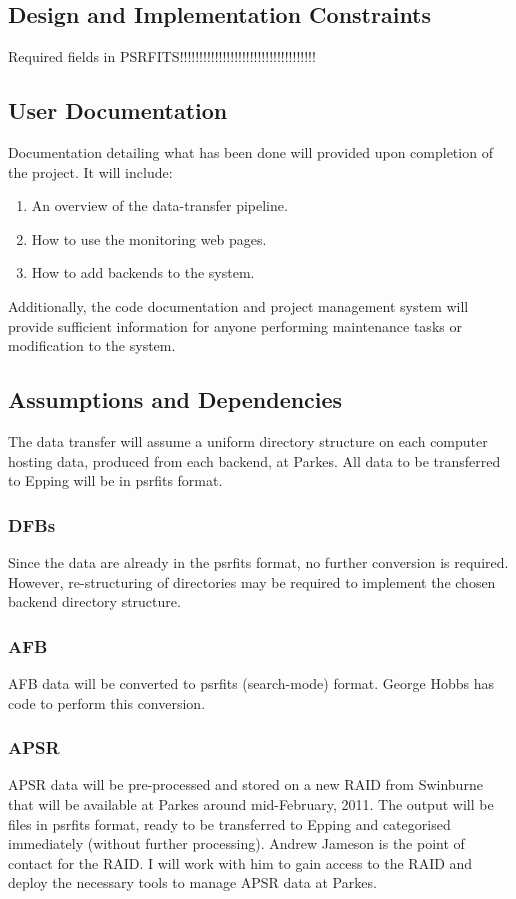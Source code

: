\documentclass[a4paper,11pt]{article}
\begin{document}
\subsection{Design and Implementation Constraints}
Required fields in PSRFITS!!!!!!!!!!!!!!!!!!!!!!!!!!!!!!!!!!!

\subsection{User Documentation}
Documentation detailing what has been done will provided upon completion of the project. It will include:
\begin{enumerate}
\item An overview of the data-transfer pipeline.
\item How to use the monitoring web pages.
\item How to add backends to the system.
\end{enumerate}

Additionally, the code documentation and project management system will provide sufficient information for anyone performing maintenance tasks or modification to the system.

\subsection{Assumptions and Dependencies}
The data transfer will assume a uniform directory structure on each computer hosting data, produced from each backend, at Parkes. All data to be transferred to Epping will be in psrfits format.

\subsubsection{DFBs}
Since the data are already in the psrfits format, no further conversion is required. However, re-structuring of directories may be required to implement the chosen backend directory structure.

\subsubsection{AFB}
AFB data will be converted to psrfits (search-mode) format. George Hobbs has code to perform this conversion.

\subsubsection{APSR}
APSR data will be pre-processed and stored on a new RAID from Swinburne that will be available at Parkes around mid-February, 2011. The output will be files in psrfits format, ready to be transferred to Epping and categorised immediately (without further processing). Andrew Jameson is the point of contact for the RAID. I will work with him to gain access to the RAID and deploy the necessary tools to manage APSR data at Parkes.
\end{document}
